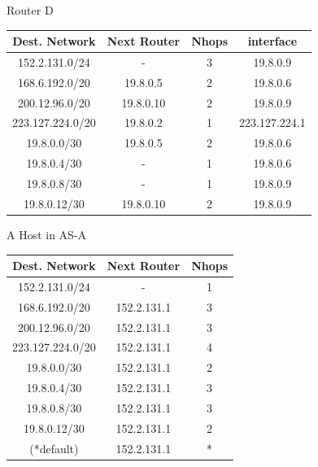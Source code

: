 \documentclass[a4paper, 11pt]{article}
\begin{document}
	\begin{center}
		Router D \\
		\vspace{2mm}
		
		\begin{tabular}{|c|c|c|c|}
			\hline
			Dest. Network  & Next Router & Nhops & interface\\ 
			\hline
				152.2.131.0/24 & - & 3 & 19.8.0.9\\ 
				168.6.192.0/20 & 19.8.0.5 & 2 & 19.8.0.6\\ 
				200.12.96.0/20 & 19.8.0.10 & 2 & 19.8.0.9\\ 
				223.127.224.0/20 & 19.8.0.2 & 1 & 223.127.224.1\\ 
				19.8.0.0/30 & 19.8.0.5 & 2 & 19.8.0.6\\ 
				19.8.0.4/30 & - & 1 & 19.8.0.6\\ 
				19.8.0.8/30 & - & 1 & 19.8.0.9\\ 
				19.8.0.12/30 & 19.8.0.10 & 2 & 19.8.0.9 \\
			\hline
		\end{tabular}
	\end{center}

	\begin{center}
		A Host in AS-A \\
		\vspace{2mm}
		
		\begin{tabular}{|c|c|c|}
			\hline
			Dest. Network  & Next Router & Nhops\\ 
			\hline
				152.2.131.0/24 & - & 1\\ 
				168.6.192.0/20 & 152.2.131.1 & 3\\ 
				200.12.96.0/20 & 152.2.131.1 & 3\\ 
				223.127.224.0/20 & 152.2.131.1 & 4\\ 
				19.8.0.0/30 & 152.2.131.1 & 2\\ 
				19.8.0.4/30 & 152.2.131.1 & 3\\ 
				19.8.0.8/30 & 152.2.131.1 & 3\\ 
				19.8.0.12/30 & 152.2.131.1 & 2\\ 
				(*default) & 152.2.131.1 & * \\
			\hline
		\end{tabular}
	\end{center}
\end{document}
